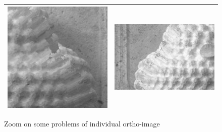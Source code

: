 \begin{figure}
\begin{tabular}{||c|c||}
   \hline \hline
   \includegraphics[width=80mm]{FIGS/Boudhas/PB-Ort_IMG_5591.jpg}   &
   \includegraphics[width=80mm]{FIGS/Boudhas/PB-Ort_IMG_5592.jpg}   \\ \hline  \hline
\end{tabular}
\label{Pb:Indiv:Ortho}
\caption{Zoom on some problems of  individual ortho-image}
\end{figure}




